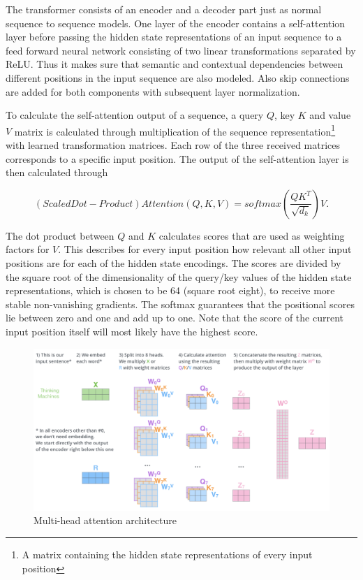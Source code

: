 The transformer consists of an encoder and a decoder part just as normal sequence to sequence models. One layer of the encoder contains a self-attention layer before passing the hidden state representations of an input sequence to a feed forward neural network consisting of two linear trans\-for\-ma\-ti\-ons separated by \ac{ReLU}. Thus it makes sure that semantic and contextual dependencies between different positions in the input sequence are also modeled. Also skip connections are added for both components with subsequent layer normalization. \cite{Alammar2018, Vaswani2017}

To calculate the self-attention output of a sequence, a query $Q$, key $K$ and value $V$ matrix is calculated through multiplication of the sequence representation\footnote{A matrix containing the hidden state representations of every input position} with learned transformation matrices. Each row of the three received matrices corresponds to a specific input position. The output of the self-attention layer is then calculated through

\begin{equation}
	(Scaled Dot-Product) Attention(Q, K, V) = softmax(\frac{QK^T}{\sqrt{d_k}})V.
\end{equation}

The dot product between $Q$ and $K$ calculates scores that are used as weighting factors for $V$. This describes for every input position how relevant all other input positions are for each of the hidden state encodings. The scores are divided by the square root of the dimensionality of the query/key values of the hidden state representations, which is chosen to be 64 (square root eight), to receive more stable non-vanishing gradients. The softmax guarantees that the positional scores lie between zero and one and add up to one. Note that the score of the current input position itself will most likely have the highest score. \cite{Alammar2018, Vaswani2017}

\begin{figure}[ht]
	\centering
	\includegraphics[width=\linewidth]{figures/multi_head_attention.png}
	\caption{Multi-head attention architecture \cite{Alammar2018}}
	\label{multi-head-attention}
\end{figure}

